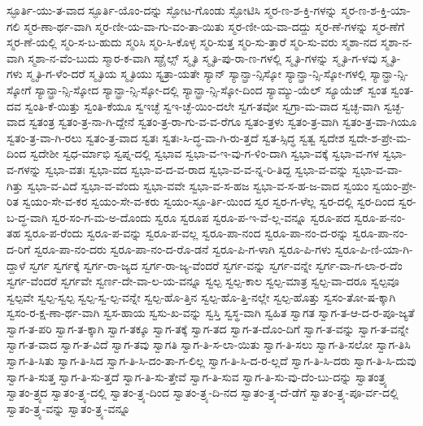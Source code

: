 {ಸ್ಫೂರ್ತಿ-ಯು-ತ-ವಾದ
ಸ್ಫೂರ್ತಿ-ಯೊಂ-ದನ್ನು
ಸ್ಫೋಟ-ಗೊಂಡು
ಸ್ಫೋಟಿಸಿ
ಸ್ಮರ-ಣ-ಶ-ಕ್ತಿ-ಗಳನ್ನು
ಸ್ಮರ-ಣ-ಶ-ಕ್ತಿ-ಯಾ-ಗಲಿ
ಸ್ಮರ-ಣಾ-ರ್ಥ-ವಾಗಿ
ಸ್ಮರ-ಣೀ-ಯ-ವಾ-ಗು-ವಂ-ತಾ-ಯಿತು
ಸ್ಮರ-ಣೀ-ಯ-ವಾ-ದದ್ದು
ಸ್ಮರ-ಣೆ-ಗಳನ್ನು
ಸ್ಮರ-ಣೆಗೆ
ಸ್ಮರ-ಣೆ-ಯಲ್ಲಿ
ಸ್ಮರಿ-ಸ-ಬ-ಹುದು
ಸ್ಮರಿಸಿ
ಸ್ಮರಿ-ಸಿ-ಕೊಳ್ಳ
ಸ್ಮರಿ-ಸುತ್ತ
ಸ್ಮರಿ-ಸು-ತ್ತಾರೆ
ಸ್ಮರಿ-ಸು-ವರು
ಸ್ಮಶಾ-ನದ
ಸ್ಮಶಾ-ನ-ವಾಗಿ
ಸ್ಮಶಾ-ನ-ವೆಂ-ಬುದು
ಸ್ಮಾರ-ಕ-ವಾಗಿ
ಸ್ಮಾೈಲ್ಸ್
ಸ್ಮೃತಿ
ಸ್ಮೃತಿ-ಪು-ರಾ-ಣ-ಗಳಲ್ಲಿ
ಸ್ಮೃತಿ-ಗಳನ್ನು
ಸ್ಮೃತಿ-ಗ-ಳವು
ಸ್ಮೃತಿ-ಗಳು
ಸ್ಮೃತಿ-ಗ-ಳೆಂ-ದರೆ
ಸ್ಮೃತಿಯ
ಸ್ಮೃತಿಯು
ಸ್ಯತ್ರಾ-ಯತೇ
ಸ್ಯಾನ್
ಸ್ಯಾನ್ಫ್ರಾ-ನ್ಸಿಸ್ಕೋ
ಸ್ಯಾನ್ಫ್ರಾ-ನ್ಸಿ-ಸ್ಕೋ-ಗಳಲ್ಲಿ
ಸ್ಯಾನ್ಫ್ರಾ-ನ್ಸಿ-ಸ್ಕೋಗೆ
ಸ್ಯಾನ್ಫ್ರಾ-ನ್ಸಿ-ಸ್ಕೋದ
ಸ್ಯಾನ್ಫ್ರಾ-ನ್ಸಿ-ಸ್ಕೋ-ದಲ್ಲಿ
ಸ್ಯಾನ್ಫ್ರಾ-ನ್ಸಿ-ಸ್ಕೋ-ದಿಂದ
ಸ್ಯಾಮ್ಯು-ಯೆಲ್
ಸ್ಯೂಯೆಜ್
ಸ್ವಂತ
ಸ್ವಂತ-ದವ
ಸ್ವಂತಿ-ಕೆ-ಯಿತ್ತು
ಸ್ವಂತಿ-ಕೆಯೂ
ಸ್ವಇಚ್ಛೆ
ಸ್ವಇ-ಚ್ಛೆ-ಯಿಂ-ದಲೇ
ಸ್ವಗ-ತವೋ
ಸ್ವಗ್ರಾ-ಮ-ವಾದ
ಸ್ವಚ್ಛ-ವಾಗಿ
ಸ್ವಚ್ಛ-ವಾದ
ಸ್ವತಂತ್ರ
ಸ್ವತಂ-ತ್ರ-ನಾ-ಗಿ-ದ್ದೇನೆ
ಸ್ವತಂ-ತ್ರ-ರಾ-ಗು-ವ-ವ-ರೆಗೂ
ಸ್ವತಂ-ತ್ರಳು
ಸ್ವತಂ-ತ್ರ-ವಾಗಿ
ಸ್ವತಂ-ತ್ರ-ವಾ-ಗಿಯೂ
ಸ್ವತಂ-ತ್ರ-ವಾ-ಗಿ-ರಲು
ಸ್ವತಂ-ತ್ರ-ವಾದ
ಸ್ವತಃ
ಸ್ವತಃ-ಸಿ-ದ್ಧ-ವಾ-ಗಿ-ರು-ತ್ತದೆ
ಸ್ವತ-ಸ್ಸಿದ್ಧ
ಸ್ವತ್ವ
ಸ್ವದೇಶ
ಸ್ವದೇ-ಶ-ಪ್ರೇ-ಮ-ದಿಂದ
ಸ್ವದೇಶೀ
ಸ್ವಧ-ರ್ಮಾಭಿ
ಸ್ವಪ್ನ-ದಲ್ಲಿ
ಸ್ವಭಾವ
ಸ್ವಭಾ-ವ-ಇ-ವು-ಗ-ಳಿಂ-ದಾಗಿ
ಸ್ವಭಾ-ವಕ್ಕೆ
ಸ್ವಭಾ-ವ-ಗಳ
ಸ್ವಭಾ-ವ-ಗಳನ್ನು
ಸ್ವಭಾ-ವತಃ
ಸ್ವಭಾ-ವದ
ಸ್ವಭಾ-ವ-ದ-ವ-ರಾದ
ಸ್ವಭಾ-ವ-ವ-ನ್ನ-ರಿ-ತಿದ್ದ
ಸ್ವಭಾ-ವ-ವನ್ನು
ಸ್ವಭಾ-ವ-ವಾ-ಗಿತ್ತು
ಸ್ವಭಾ-ವ-ವಿದೆ
ಸ್ವಭಾ-ವ-ವೆಂದು
ಸ್ವಭಾ-ವವೇ
ಸ್ವಭಾ-ವ-ಸ-ಹಜ
ಸ್ವಭಾ-ವ-ಸ-ಹ-ಜ-ವಾದ
ಸ್ವಯಂ
ಸ್ವಯಂ-ಪ್ರೇ-ರಿತ
ಸ್ವಯಂ-ಸೇ-ವ-ಕರ
ಸ್ವಯಂ-ಸೇ-ವ-ಕರು
ಸ್ವಯಂ-ಸ್ಫೂ-ರ್ತಿ-ಯಿಂದ
ಸ್ವರ
ಸ್ವರ-ಗ-ಳೆಲ್ಲ
ಸ್ವರ-ದಲ್ಲಿ
ಸ್ವರ-ದಿಂದ
ಸ್ವರ-ಬ-ದ್ಧ-ವಾಗಿ
ಸ್ವರ-ಸಂ-ಗ-ಮ-ಅ-ದೊಂದು
ಸ್ವರೂ
ಸ್ವರೂಪ
ಸ್ವರೂ-ಪ-ಇ-ವೆ-ಲ್ಲ-ವನ್ನೂ
ಸ್ವರೂ-ಪದ
ಸ್ವರೂ-ಪ-ನಂ-ತಹ
ಸ್ವರೂ-ಪ-ರೆಂದು
ಸ್ವರೂ-ಪ-ವನ್ನು
ಸ್ವರೂ-ಪ-ವಲ್ಲ
ಸ್ವರೂ-ಪಾ-ನಂದ
ಸ್ವರೂ-ಪಾ-ನಂ-ದ-ರನ್ನು
ಸ್ವರೂ-ಪಾ-ನಂ-ದ-ರಿಗೆ
ಸ್ವರೂ-ಪಾ-ನಂ-ದರು
ಸ್ವರೂ-ಪಾ-ನಂ-ದ-ರೊ-ಡನೆ
ಸ್ವರೂ-ಪಿ-ಗ-ಳಾಗಿ
ಸ್ವರೂ-ಪಿ-ಗಳು
ಸ್ವರೂ-ಪಿ-ಣಿ-ಯಾ-ಗಿ-ದ್ದಾಳೆ
ಸ್ವರ್ಗ
ಸ್ವರ್ಗಕ್ಕೆ
ಸ್ವರ್ಗ-ರಾ-ಜ್ಯದ
ಸ್ವರ್ಗ-ರಾ-ಜ್ಯ-ವೆಂದರೆ
ಸ್ವರ್ಗ-ವನ್ನು
ಸ್ವರ್ಗ-ವನ್ನೇ
ಸ್ವರ್ಗ-ವಾ-ಗ-ಲಾ-ರ-ದೆಂ
ಸ್ವರ್ಗ-ವೆಂದರೆ
ಸ್ವರ್ಗವೇ
ಸ್ವರ್ಣ-ದೇ-ವಾ-ಲ-ಯ-ವನ್ನೂ
ಸ್ವಲ್ಪ
ಸ್ವಲ್ಪ-ಕಾಲ
ಸ್ವಲ್ಪ-ಮಾತ್ರ
ಸ್ವಲ್ಪ-ವಾ-ದರೂ
ಸ್ವಲ್ಪವೂ
ಸ್ವಲ್ಪವೇ
ಸ್ವಲ್ಪ-ಸ್ವಲ್ಪ
ಸ್ವಲ್ಪ-ಸ್ವ-ಲ್ಪ-ವನ್ನೇ
ಸ್ವಲ್ಪ-ಹೊ-ತ್ತಿನ
ಸ್ವಲ್ಪ-ಹೊ-ತ್ತಿ-ನಲ್ಲೇ
ಸ್ವಲ್ಪ-ಹೊತ್ತು
ಸ್ವಸಂ-ತೋ-ಷ-ಕ್ಕಾಗಿ
ಸ್ವಸಂ-ರ-ಕ್ಷ-ಣಾ-ರ್ಥ-ವಾಗಿ
ಸ್ವಸ-ಹಾಯ
ಸ್ವಸು-ಖ-ವನ್ನು
ಸ್ವಸ್ತಿ
ಸ್ವಸ್ಥ-ವಾಗಿ
ಸ್ವಹಿತ
ಸ್ವಾಗತ
ಸ್ವಾಗ-ತ-ಆ-ದ-ರ-ಪೂ-ಜ್ಯತೆ
ಸ್ವಾಗ-ತ-ಪರಿ
ಸ್ವಾಗ-ತ-ಕ್ಕಾಗಿ
ಸ್ವಾಗ-ತಕ್ಕೂ
ಸ್ವಾಗ-ತಕ್ಕೆ
ಸ್ವಾಗ-ತದ
ಸ್ವಾಗ-ತ-ದೊಂ-ದಿಗೆ
ಸ್ವಾಗ-ತ-ವನ್ನು
ಸ್ವಾಗ-ತ-ವನ್ನೇ
ಸ್ವಾಗ-ತ-ವಾದ
ಸ್ವಾಗ-ತ-ವಿದೆ
ಸ್ವಾಗ-ತವು
ಸ್ವಾಗತಿ
ಸ್ವಾಗ-ತಿ-ಸ-ಲಾ-ಯಿತು
ಸ್ವಾಗ-ತಿ-ಸಲು
ಸ್ವಾಗ-ತಿ-ಸಲೋ
ಸ್ವಾಗ-ತಿಸಿ
ಸ್ವಾಗ-ತಿ-ಸಿತು
ಸ್ವಾಗ-ತಿ-ಸಿದ
ಸ್ವಾಗ-ತಿ-ಸಿ-ದಂ-ತಾ-ಗ-ಲಿಲ್ಲ
ಸ್ವಾಗ-ತಿ-ಸಿ-ದ-ರ-ಲ್ಲದೆ
ಸ್ವಾಗ-ತಿ-ಸಿ-ದರು
ಸ್ವಾಗ-ತಿ-ಸಿ-ದುವು
ಸ್ವಾಗ-ತಿ-ಸುತ್ತ
ಸ್ವಾಗ-ತಿ-ಸು-ತ್ತದೆ
ಸ್ವಾಗ-ತಿ-ಸು-ತ್ತೇವೆ
ಸ್ವಾಗ-ತಿ-ಸುವ
ಸ್ವಾಗ-ತಿ-ಸು-ವು-ದೆಂ-ಬು-ದನ್ನು
ಸ್ವಾತಂತ್ರ್ಯ
ಸ್ವಾತಂ-ತ್ರ್ಯದ
ಸ್ವಾತಂ-ತ್ರ್ಯ-ದಲ್ಲಿ
ಸ್ವಾತಂ-ತ್ರ್ಯ-ದಿಂದ
ಸ್ವಾತಂ-ತ್ರ್ಯ-ದಿ-ನದ
ಸ್ವಾತಂ-ತ್ರ್ಯ-ದೆ-ಡೆಗೆ
ಸ್ವಾತಂ-ತ್ರ್ಯ-ಪೂ-ರ್ವ-ದಲ್ಲಿ
ಸ್ವಾತಂ-ತ್ರ್ಯ-ವನ್ನು
ಸ್ವಾತಂ-ತ್ರ್ಯ-ವನ್ನೂ
}
